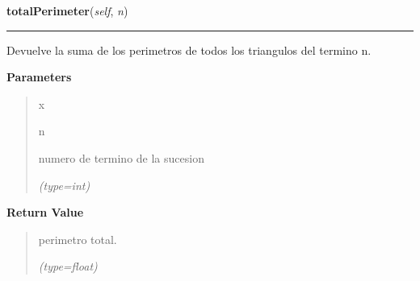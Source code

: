 \hspace{.8\funcindent}\begin{boxedminipage}{\funcwidth}

    \raggedright \textbf{totalPerimeter}(\textit{self}, \textit{n})

    \vspace{-1.5ex}

    \rule{\textwidth}{0.5\fboxrule}
\setlength{\parskip}{2ex}
    Devuelve la suma de los perimetros de todos los triangulos del termino 
    n.

\setlength{\parskip}{1ex}
      \textbf{Parameters}
      \vspace{-1ex}

      \begin{quote}
        \begin{Ventry}{x}

          \item[n]

          numero de termino de la sucesion

            {\it (type=int)}

        \end{Ventry}

      \end{quote}

      \textbf{Return Value}
    \vspace{-1ex}

      \begin{quote}
      perimetro total.

      {\it (type=float)}

      \end{quote}

    \end{boxedminipage}

    \label{FractalZE:sierpinsky:Sierpinsky:triangleHeight}

    \vspace{0.5ex}

